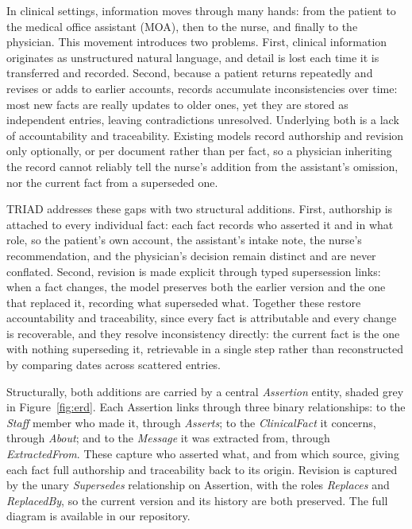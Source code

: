 \documentclass[sigconf]{acmart}
\begin{document}
In clinical settings, information moves through many hands: from the patient to the medical office assistant (MOA), then to the nurse, and finally to the physician. This movement introduces two problems. First, clinical information originates as unstructured natural language, and detail is lost each time it is transferred and recorded. Second, because a patient returns repeatedly and revises or adds to earlier accounts, records accumulate inconsistencies over time: most new facts are really updates to older ones, yet they are stored as independent entries, leaving contradictions unresolved. Underlying both is a lack of accountability and traceability. Existing models record authorship and revision only optionally, or per document rather than per fact, so a physician inheriting the record cannot reliably tell the nurse's addition from the assistant's omission, nor the current fact from a superseded one.

TRIAD addresses these gaps with two structural additions. First, authorship is attached to every individual fact: each fact records who asserted it and in what role, so the patient's own account, the assistant's intake note, the nurse's recommendation, and the physician's decision remain distinct and are never conflated. Second, revision is made explicit through typed supersession links: when a fact changes, the model preserves both the earlier version and the one that replaced it, recording what superseded what. Together these restore accountability and traceability, since every fact is attributable and every change is recoverable, and they resolve inconsistency directly: the current fact is the one with nothing superseding it, retrievable in a single step rather than reconstructed by comparing dates across scattered entries.

Structurally, both additions are carried by a central \textit{Assertion} entity, shaded grey in Figure~\ref{fig:erd}. Each Assertion links through three binary relationships: to the \textit{Staff} member who made it, through \textit{Asserts}; to the \textit{ClinicalFact} it concerns, through \textit{About}; and to the \textit{Message} it was extracted from, through \textit{ExtractedFrom}. These capture who asserted what, and from which source, giving each fact full authorship and traceability back to its origin. Revision is captured by the unary \textit{Supersedes} relationship on Assertion, with the roles \textit{Replaces} and \textit{ReplacedBy}, so the current version and its history are both preserved. The full diagram is available in our repository.
\end{document}
